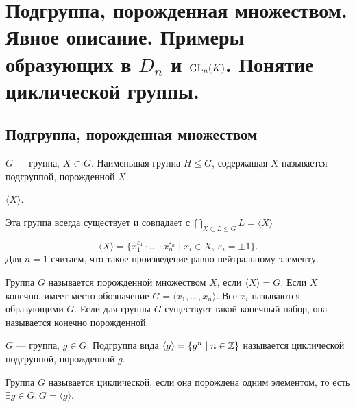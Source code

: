 % 
% 
\section{Подгруппа, порожденная множеством. Явное описание. Примеры образующих в $ D_n$ и $ {\mathop{\text{\rm GL}}}_n(K)$. Понятие циклической группы.}

\subsection{Подгруппа, порожденная множеством}
\begin{defn}
    $ G$ --- группа, $ X \subset G$. Наименьшая группа $ H \le G$, содержащая $ X$ называется  {\sf подгруппой, порожденной $ X$}.  
    \begin{name}
        $ \langle X \rangle$.
    \end{name}
    \begin{note}
	Эта группа всегда существует и совпадает с 
	$
         \bigcap_{X \subset L \le G} L = \langle X \rangle
	$
    \end{note}
\end{defn}
\begin{st}
    \[
    \langle X \rangle = \{x_1^{\varepsilon_1}\cdot \ldots \cdot x_{n}^{\varepsilon _n} \mid x_i \in  X, ~ \varepsilon _i = \pm 1\}
    .\] 
    Для $ n = 1$ считаем, что такое произведение равно нейтральному элементу.
\end{st}
\begin{defn}
    Группа $ G$ называется {\sf порожденной множеством } $ X$, если   $ \langle X \rangle = G$. Если $ X$ конечно, имеет место обозначение  $ G = \langle x_1, \ldots , x_{n} \rangle$. Все $ x_i$ называются  {\sf образующими} $ G$. Если для группы  $ G$ существует такой конечный набор, она называется  {\sf конечно порожденной}.    
\end{defn}
\begin{defn}
    $ G$ --- группа, $ g \in  G$. Подгруппа вида $ \langle g \rangle = \{g^{n}\mid n \in  \mathbb{Z}\}$ называется {\sf циклической подгруппой, порожденной $ g$}.  
\end{defn}
\begin{defn}
    Группа $ G$ называется \textsf{циклической}, если она порождена одним элементом, то есть $ \exists g \in  G\colon G = \langle g \rangle$.
\end{defn}

